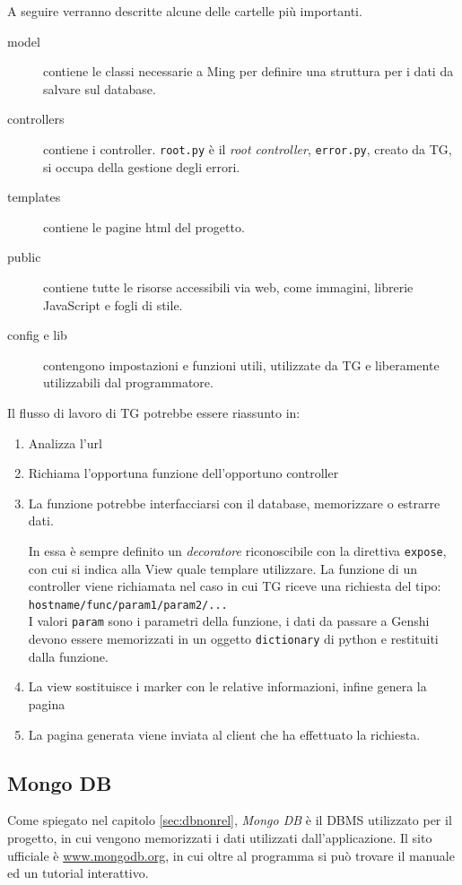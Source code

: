 A seguire verranno descritte alcune delle cartelle più importanti.
\begin{description}
\item[model] contiene le classi necessarie a Ming per definire una struttura per i dati da salvare sul database.
\item[controllers] contiene i controller. \texttt{root.py} è il \emph{root controller}, \texttt{error.py}, creato da TG, si occupa della gestione degli errori.
\item[templates] contiene le pagine html del progetto.
\item[public] contiene tutte le risorse accessibili via web, come immagini, librerie JavaScript e fogli di stile.
\item[config e lib] contengono impostazioni e funzioni utili, utilizzate da TG e liberamente utilizzabili dal programmatore.
\end{description}

Il flusso di lavoro di TG potrebbe essere riassunto in:
\begin{enumerate}
\item Analizza l'url
\item Richiama l'opportuna funzione dell'opportuno controller
\item La funzione potrebbe interfacciarsi con il database, memorizzare o estrarre dati. 

In essa è sempre definito un \emph{decoratore} riconoscibile con la direttiva \texttt{expose}, con cui si indica alla View quale templare utilizzare. La funzione di un controller viene richiamata nel caso in cui TG riceve una richiesta del tipo: \\ \texttt{hostname/func/param1/param2/...} \\ I valori \texttt{param} sono i parametri della funzione, i dati da passare a Genshi devono essere memorizzati in un oggetto \texttt{dictionary} di python e restituiti dalla funzione. 
\item La view sostituisce i marker con le relative informazioni, infine genera la pagina
\item La pagina generata viene inviata al client che ha effettuato la richiesta.
\end{enumerate}

		
\subsection{Mongo DB}\label{sec:mongo}
Come spiegato nel capitolo \ref{sec:dbnonrel}, \emph{Mongo DB} è il DBMS utilizzato per il progetto, in cui vengono memorizzati i dati utilizzati dall'applicazione. Il sito ufficiale è \url{www.mongodb.org}, in cui oltre al programma si può trovare il manuale ed un tutorial interattivo. 

